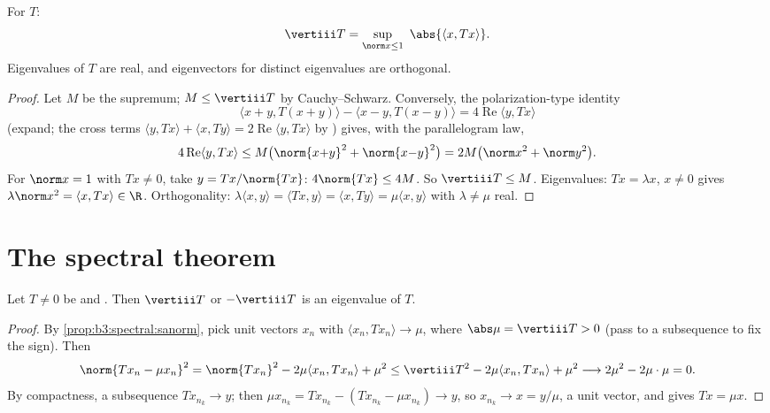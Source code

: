 \begin{proposition}\label{prop:b3:spectral:sanorm}
For  $T$:
\[
\vertiii T = \sup_{\norm x \leq 1}\ \abs{\langle x,
Tx\rangle} .
\]
Eigenvalues of $T$ are real, and eigenvectors for distinct
eigenvalues are orthogonal.
\end{proposition}

\begin{proof}
Let $M$ be the supremum; $M \leq \vertiii T$ by
Cauchy--Schwarz. Conversely, the polarization-type identity
\[
\langle x{+}y, T(x{+}y)\rangle - \langle x{-}y,
T(x{-}y)\rangle = 4\operatorname{Re}\langle y, Tx\rangle
\]
(expand; the cross terms $\langle y, Tx\rangle + \langle x,
Ty\rangle = 2\operatorname{Re}\langle y, Tx\rangle$ by
) gives, with the parallelogram law,
\[
4\operatorname{Re}\langle y, Tx\rangle \leq
M\bigl(\norm{x{+}y}^2 + \norm{x{-}y}^2\bigr) = 2M\bigl(\norm
x^2 + \norm y^2\bigr).
\]
For $\norm x = 1$ with $Tx \neq 0$, take $y = Tx/\norm{Tx}$:
$4\norm{Tx} \leq 4M$. So $\vertiii T \leq M$. Eigenvalues:
$Tx = \lambda x$, $x \ne 0$ gives $\lambda\norm x^2 = \langle
x, Tx\rangle \in \R$. Orthogonality: $\lambda\langle x,
y\rangle = \langle Tx, y\rangle = \langle x, Ty\rangle =
\mu\langle x, y\rangle$ with $\lambda \neq \mu$ real.
\end{proof}

\section{The spectral theorem}

\begin{lemma}
\label{lem:b3:spectral:existence}
Let $T \neq 0$ be  and . Then $\vertiii T$
or $-\vertiii T$ is an eigenvalue of $T$.
\end{lemma}

\begin{proof}
By \cref{prop:b3:spectral:sanorm}, pick unit vectors $x_n$
with $\langle x_n, Tx_n\rangle \to \mu$, where $\abs\mu =
\vertiii T > 0$ (pass to a subsequence to fix the sign). Then
\[
\norm{Tx_n - \mu x_n}^2
= \norm{Tx_n}^2 - 2\mu\langle x_n, Tx_n\rangle + \mu^2
\leq \vertiii T^2 - 2\mu\langle x_n, Tx_n\rangle + \mu^2
\longrightarrow 2\mu^2 - 2\mu\cdot\mu = 0 .
\]
By compactness, a subsequence $Tx_{n_k} \to y$; then $\mu
x_{n_k} = Tx_{n_k} - (Tx_{n_k} - \mu x_{n_k}) \to y$, so
$x_{n_k} \to x = y/\mu$, a unit vector, and  gives
$Tx = \mu x$.
\end{proof}

